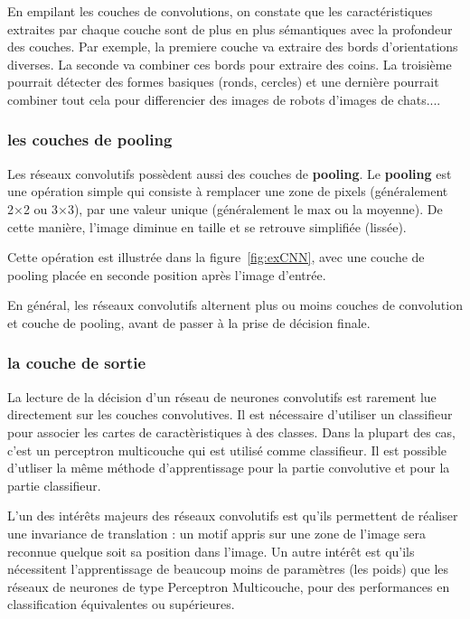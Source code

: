 En empilant les couches de convolutions, on constate que les caractéristiques
extraites par chaque couche sont de plus en plus sémantiques avec la profondeur
des couches. Par exemple, la premiere couche va extraire des bords
d'orientations diverses. La seconde va combiner ces bords pour extraire des
coins. La troisième pourrait détecter des formes basiques (ronds, cercles)
et une dernière pourrait combiner tout cela pour differencier des images de
robots d'images de chats....

\subsubsection{les couches de pooling}

Les réseaux convolutifs possèdent aussi des couches de \textbf{pooling}.
Le \textbf{pooling} est une opération simple qui consiste à remplacer une zone
de pixels (généralement 2×2 ou 3×3), par une valeur unique
(généralement le max ou la moyenne).
De cette manière, l’image diminue en taille et se retrouve simplifiée (lissée).

Cette opération est illustrée dans la figure~\ref{fig:exCNN}, avec une couche
de pooling placée en seconde position après l'image d'entrée.

En général, les réseaux convolutifs alternent plus ou moins couches de
convolution et couche de pooling, avant de passer à la prise de décision finale.

\subsubsection{la couche de sortie}

La lecture de la décision d'un réseau de neurones convolutifs est rarement lue directement
sur les couches convolutives.
Il est nécessaire d'utiliser un classifieur pour associer les cartes de caractèristiques
à des classes.
Dans la plupart des cas, c'est un perceptron multicouche qui est utilisé comme classifieur. Il est possible d'utliser la même méthode d'apprentissage pour la partie convolutive et pour la partie classifieur.


L'un des intérêts majeurs des réseaux convolutifs est qu'ils permettent de
réaliser une invariance de translation :
un motif appris sur une zone de l'image sera reconnue quelque soit sa position
dans l'image.
Un autre intérêt est qu'ils nécessitent l'apprentissage de beaucoup moins de
paramètres (les poids) que les réseaux de neurones de type Perceptron
Multicouche, pour des performances en classification équivalentes ou
supérieures.


